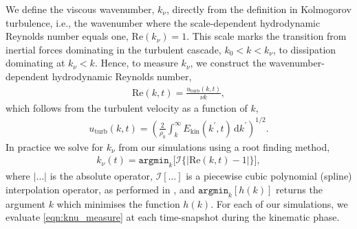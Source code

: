 \documentclass[12pt,twoside]{extreport}
\makeatletter
\newcommand{\rbrac}[1]{\left( #1 \right)} %
\newcommand{\mdd}[1]{\mathrm{d} #1}
\newcommand{\mReh}{\ensuremath{\mathrm{Re}}} %
\newcommand{\ie}{i.e.,\xspace} %
\providecommand{\DIFaddtex}[1]{{\protect\color{DIFgreen}\uwave{#1}}} %
\providecommand{\DIFdeltex}[1]{{\protect\color{DIFpurple}\sout{#1}}} %
\providecommand{\DIFaddbegin}{} %
\providecommand{\DIFaddend}{} %
\providecommand{\DIFdelbegin}{} %
\providecommand{\DIFdelend}{} %
\providecommand{\DIFadd}[1]{\texorpdfstring{\DIFaddtex{#1}}{#1}} %
\providecommand{\DIFdel}[1]{\texorpdfstring{\DIFdeltex{#1}}{}} %
\providecommand{\DIFscaledelfig}{0.5}
\newlength{\DIFdelgraphicswidth} %
\newlength{\DIFdelgraphicsheight} %
\providecommand{\DIFaddincludegraphics}[2][]{{\color{DIFgreen}\fbox{\DIFOincludegraphics[#1]{#2}}}} %
\providecommand{\DIFdelincludegraphics}[2][]{%
\sbox{\DIFdelgraphicsbox}{\DIFOincludegraphics[#1]{#2}}%
\settoboxwidth{\DIFdelgraphicswidth}{\DIFdelgraphicsbox} %
\settoboxtotalheight{\DIFdelgraphicsheight}{\DIFdelgraphicsbox} %
\scalebox{\DIFscaledelfig}{%
\parbox[b]{\DIFdelgraphicswidth}{\usebox{\DIFdelgraphicsbox}\\[-\baselineskip] \rule{\DIFdelgraphicswidth}{0em}}\llap{\resizebox{\DIFdelgraphicswidth}{\DIFdelgraphicsheight}{%
\setlength{\unitlength}{\DIFdelgraphicswidth}%
\begin{picture}(1,1)%
\thicklines\linethickness{2pt} %
{\color{DIFpurple}\put(0,0){\framebox(1,1){}}}%
{\color{DIFpurple}\put(0,0){\line( 1,1){1}}}%
{\color{DIFpurple}\put(0,1){\line(1,-1){1}}}%
\end{picture}%
}\hspace*{3pt}}} %
} %
\DeclareRobustCommand{\DIFaddbegin}{\DIFOaddbegin \let\includegraphics\DIFaddincludegraphics} %
\DeclareRobustCommand{\DIFaddend}{\DIFOaddend \let\includegraphics\DIFOincludegraphics} %
\DeclareRobustCommand{\DIFdelbegin}{\DIFOdelbegin \let\includegraphics\DIFdelincludegraphics} %
\DeclareRobustCommand{\DIFdelend}{\DIFOaddend \let\includegraphics\DIFOincludegraphics} %
\let\sout@orig\sout %
\renewcommand{\sout}[1]{\ifmmode\text{\sout@orig{\ensuremath{#1}}}\else\sout@orig{#1}\fi} %
\makeatother
\begin{document}
We define the viscous wavenumber, $k_\nu$, directly from the definition in Kolmogorov turbulence, \ie the wavenumber where the scale-dependent hydrodynamic Reynolds number equals one, $\mReh(k_\nu) = 1$. This scale marks the transition from inertial forces dominating in the turbulent cascade, \DIFdelbegin \DIFdel{$k_0 < k < k_\nu$}\DIFdelend \DIFaddbegin \DIFadd{$k_\mathrm{turb} < k < k_\nu$}\DIFaddend , to dissipation dominating at \mbox{$k_\nu < k$}. Hence, to measure $k_\nu$, we construct the wavenumber-dependent hydrodynamic Reynolds number,
\DIFdelbegin %
\DIFdelend \DIFaddbegin \begin{align}
    \mReh(k, t)
        = \frac{u_\mathrm{turb}(k,t)}{\nu k}
        , \label{eqn:reynolds_spectrum}
\end{align}\DIFaddend
which follows from the turbulent velocity as a function of $k$,
\DIFdelbegin %
\DIFdelend \DIFaddbegin \begin{align}
    u_\mathrm{turb} (k, t)
        = \rbrac{
            \frac{2}{\rho_0} \int_{k}^{\infty} E_\mathrm{kin}(k^\prime, t) \,\mdd{k^\prime}
        }^{1/2}
        . \label{eqn:velocity_k}
\end{align}\DIFaddend
In practice we solve for $k_\nu$ from our simulations using a root finding method,
\begin{align}
    k_\nu(t)
        = \texttt{argmin}_k\Big[
            \mathcal{I}\Big\{ \Big| \mReh(k, t) - 1 \Big| \Big\}
        \Big]
        , \label{eqn:knu_measure}
\end{align}
where $|\dots|$ is the absolute operator, $\mathcal{I}[\dots]$ is a piecewise cubic polynomial (spline) interpolation operator, as performed in \citet{beattie2022growth}, and $\texttt{argmin}_k[h(k)]$ returns the argument $k$ which minimises the function $h(k)$. For each of our simulations, we evaluate \autoref{eqn:knu_measure} at each time-snapshot during the kinematic phase.
\end{document}
